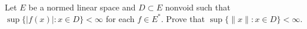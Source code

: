 Let $E$ be a normed linear space and $D \subset E$ nonvoid such that $\sup\{|f(x)| : x \in D\} < \infty$ for each $f \in E^*$. Prove that $\sup\{\|x\| : x \in D\} < \infty$.

